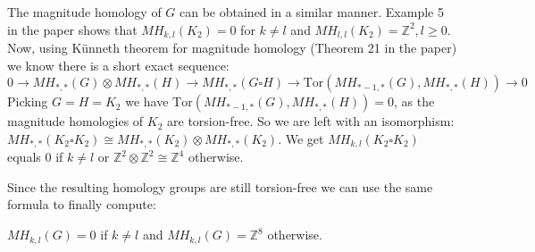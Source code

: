 \documentclass{article}
\begin{document}
The magnitude homology of $G$ can be obtained in a similar manner.
Example 5 in the paper shows that $MH_{k,l}(K_2) = 0$ for $k \neq l$ and 
$MH_{l,l}(K_2)= \mathbb{Z}^2, l \geq 0$.
Now, using Künneth theorem for magnitude homology (Theorem 21 in the paper) we know there is a short exact sequence:
\begin{equation*}
0 \to MH_{*,*}(G) \otimes MH_{*,*}(H) \to MH_{*,*}(G \square H) \to \mathrm{Tor}(MH_{*-1,*}(G),MH_{*,*}(H)) \to 0
\end{equation*}
Picking $G=H = K_2$ we have $\mathrm{Tor}(MH_{*-1,*}(G),MH_{*,*}(H)) = 0$, as the magnitude homologies of $K_2$ are torsion-free. So we are left with an isomorphism:
$MH_{*,*}(K_2 \square K_2) \cong MH_{*,*}(K_2) \otimes MH_{*,*}(K_2)$.
We get $MH_{k,l}(K_2 \square K_2)$ equals $0$ if $k \neq l$ or $\mathbb{Z}^2 \otimes \mathbb{Z}^2 \cong \mathbb{Z}^4$ otherwise.

Since the resulting homology groups are still torsion-free we can use the same formula to finally compute:

$MH_{k,l}(G) = 0$ if $k \neq l$ and $MH_{k,l}(G) = \mathbb{Z}^8$ otherwise.
\end{document}
